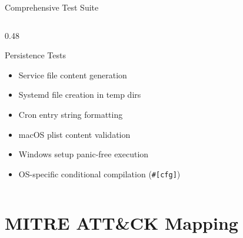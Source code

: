 \documentclass[aspectratio=169]{beamer}
\newcommand{\code}[1]{\texttt{\textcolor{primaryblue}{#1}}}
\begin{document}
\begin{frame}{Comprehensive Test Suite}
\begin{columns}[T]
\begin{column}{0.48\textwidth}
      \vspace{0.3em}
      \begin{block}{Persistence Tests}
        \footnotesize
        \begin{itemize}
          \item Service file content generation
          \item Systemd file creation in temp dirs
          \item Cron entry string formatting
          \item macOS plist content validation
          \item Windows setup panic-free execution
          \item OS-specific conditional compilation (\code{\#[cfg]})
        \end{itemize}
      \end{block}
    \end{column}
  \end{columns}
\end{frame}

\section{MITRE ATT\&CK Mapping}
\end{document}
